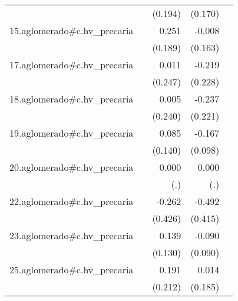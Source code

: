 {\begin{longtable}{l*{4}{D{.}{.}{-1}}}
            &                     &     (0.194)         &     (0.170)         &                     \\
\addlinespace
15.aglomerado#c.hv\_precaria&                     &       0.251         &      -0.008         &                     \\
            &                     &     (0.189)         &     (0.163)         &                     \\
\addlinespace
17.aglomerado#c.hv\_precaria&                     &       0.011         &      -0.219         &                     \\
            &                     &     (0.247)         &     (0.228)         &                     \\
\addlinespace
18.aglomerado#c.hv\_precaria&                     &       0.005         &      -0.237         &                     \\
            &                     &     (0.240)         &     (0.221)         &                     \\
\addlinespace
19.aglomerado#c.hv\_precaria&                     &       0.085         &      -0.167         &                     \\
            &                     &     (0.140)         &     (0.098)         &                     \\
\addlinespace
20.aglomerado#c.hv\_precaria&                     &       0.000         &       0.000         &                     \\
            &                     &         (.)         &         (.)         &                     \\
\addlinespace
22.aglomerado#c.hv\_precaria&                     &      -0.262         &      -0.492         &                     \\
            &                     &     (0.426)         &     (0.415)         &                     \\
\addlinespace
23.aglomerado#c.hv\_precaria&                     &       0.139         &      -0.090         &                     \\
            &                     &     (0.130)         &     (0.090)         &                     \\
\addlinespace
25.aglomerado#c.hv\_precaria&                     &       0.191         &       0.014         &                     \\
            &                     &     (0.212)         &     (0.185)         &                     \\

\end{longtable}}
